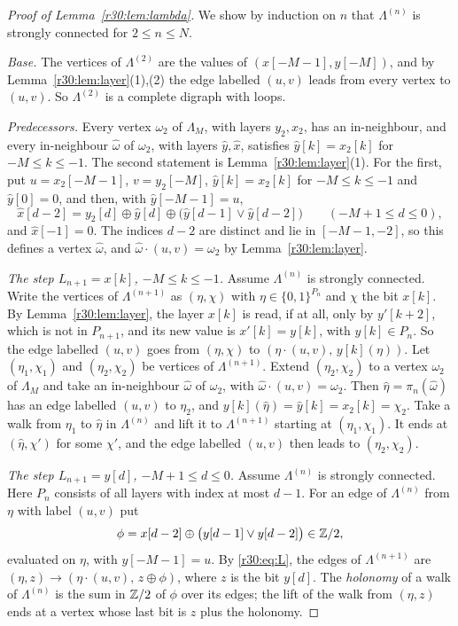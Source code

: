 \begin{proof}[Proof of Lemma~\ref{r30:lem:lambda}]
We show by induction on $n$ that $\Lambda^{(n)}$ is strongly connected for $2\le n\le N$.

\emph{Base.} The vertices of $\Lambda^{(2)}$ are the values of $(x[-M-1],y[-M])$, and by Lemma~\ref{r30:lem:layer}(1),(2) the edge labelled $(u,v)$ leads from every vertex to $(u,v)$. So $\Lambda^{(2)}$ is a complete digraph with loops.

\emph{Predecessors.} Every vertex $\omega_2$ of $\Lambda_M$, with layers $y_2,x_2$, has an in-neighbour, and every in-neighbour $\hat\omega$ of $\omega_2$, with layers $\hat y,\hat x$, satisfies $\hat y[k]=x_2[k]$ for $-M\le k\le-1$. The second statement is Lemma~\ref{r30:lem:layer}(1). For the first, put $u=x_2[-M-1]$, $v=y_2[-M]$, $\hat y[k]=x_2[k]$ for $-M\le k\le-1$ and $\hat y[0]=0$, and then, with $\hat y[-M-1]=u$,
\[
\hat x[d-2]=y_2[d]\oplus\hat y[d]\oplus\bigl(\hat y[d-1]\vee\hat y[d-2]\bigr)\qquad(-M+1\le d\le0),
\]
and $\hat x[-1]=0$. The indices $d-2$ are distinct and lie in $[-M-1,-2]$, so this defines a vertex $\hat\omega$, and $\hat\omega\cdot(u,v)=\omega_2$ by Lemma~\ref{r30:lem:layer}.

\emph{The step $L_{n+1}=x[k]$, $-M\le k\le-1$.} Assume $\Lambda^{(n)}$ is strongly connected. Write the vertices of $\Lambda^{(n+1)}$ as $(\eta,\chi)$ with $\eta\in\{0,1\}^{P_n}$ and $\chi$ the bit $x[k]$. By Lemma~\ref{r30:lem:layer}, the layer $x[k]$ is read, if at all, only by $y'[k+2]$, which is not in $P_{n+1}$, and its new value is $x'[k]=y[k]$, with $y[k]\in P_n$. So the edge labelled $(u,v)$ goes from $(\eta,\chi)$ to $(\eta\cdot(u,v),\,y[k](\eta))$. Let $(\eta_1,\chi_1)$ and $(\eta_2,\chi_2)$ be vertices of $\Lambda^{(n+1)}$. Extend $(\eta_2,\chi_2)$ to a vertex $\omega_2$ of $\Lambda_M$ and take an in-neighbour $\hat\omega$ of $\omega_2$, with $\hat\omega\cdot(u,v)=\omega_2$. Then $\hat\eta=\pi_n(\hat\omega)$ has an edge labelled $(u,v)$ to $\eta_2$, and $y[k](\hat\eta)=\hat y[k]=x_2[k]=\chi_2$. Take a walk from $\eta_1$ to $\hat\eta$ in $\Lambda^{(n)}$ and lift it to $\Lambda^{(n+1)}$ starting at $(\eta_1,\chi_1)$. It ends at $(\hat\eta,\chi')$ for some $\chi'$, and the edge labelled $(u,v)$ then leads to $(\eta_2,\chi_2)$.

\emph{The step $L_{n+1}=y[d]$, $-M+1\le d\le0$.} Assume $\Lambda^{(n)}$ is strongly connected. Here $P_n$ consists of all layers with index at most $d-1$. For an edge of $\Lambda^{(n)}$ from $\eta$ with label $(u,v)$ put
\[
\phi=x[d-2]\oplus\bigl(y[d-1]\vee y[d-2]\bigr)\in\mathbb{Z}/2,
\]
evaluated on $\eta$, with $y[-M-1]=u$. By \eqref{r30:eq:L}, the edges of $\Lambda^{(n+1)}$ are $(\eta,z)\to(\eta\cdot(u,v),\,z\oplus\phi)$, where $z$ is the bit $y[d]$. The \emph{holonomy} of a walk of $\Lambda^{(n)}$ is the sum in $\mathbb{Z}/2$ of $\phi$ over its edges; the lift of the walk from $(\eta,z)$ ends at a vertex whose last bit is $z$ plus the holonomy.


\end{proof}
